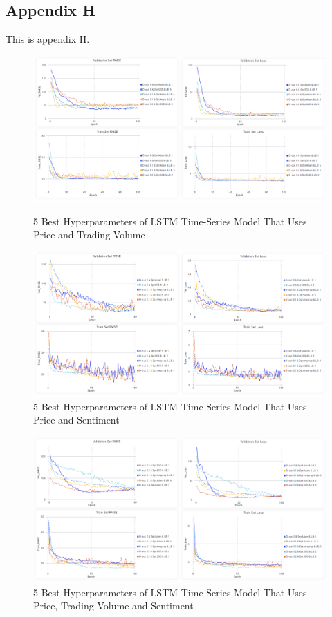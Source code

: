 \documentclass[11pt, a4paper]{article}
\begin{document}
\subsection{Appendix H}
\label{appendix:Graphics}
This is appendix H.
\begin{figure}[!hb]
    \centering
    \includegraphics[width=\textwidth]{Only_Trading_Volume.png}
    \caption{5 Best Hyperparameters of LSTM Time-Series Model That Uses Price and Trading Volume}
    \includegraphics[width=\textwidth]{Only_Sentiment.png}
    \caption{5 Best Hyperparameters of LSTM Time-Series Model That Uses Price and Sentiment}
\end{figure}

\begin{figure}[!ht]
    \centering
    \includegraphics[width=\textwidth]{All_Features.png}
    \caption{5 Best Hyperparameters of LSTM Time-Series Model That Uses Price, Trading Volume and Sentiment}
\end{figure}
\end{document}
